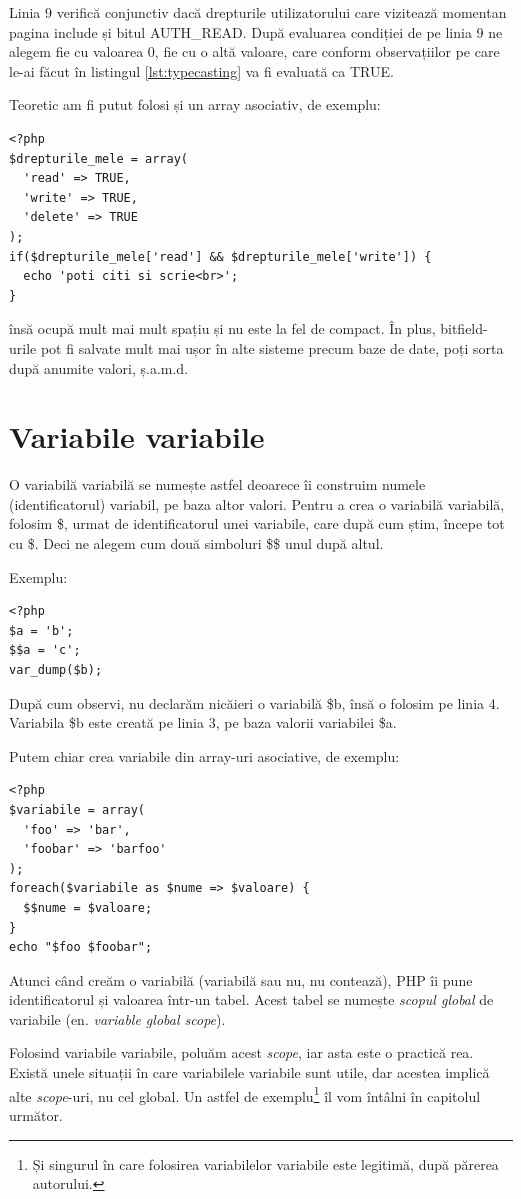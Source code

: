 Linia 9 verifică conjunctiv dacă drepturile utilizatorului care vizitează
momentan pagina include și bitul AUTH\_READ. După evaluarea condiției
de pe linia 9 ne alegem fie cu valoarea 0, fie cu o altă valoare,
care conform observațiilor pe care le-ai făcut în listingul \ref{lst:typecasting}
va fi evaluată ca TRUE.

Teoretic am fi putut folosi și un array asociativ, de exemplu:
\begin{lstlisting}
<?php
$drepturile_mele = array(
  'read' => TRUE,
  'write' => TRUE,
  'delete' => TRUE
);
if($drepturile_mele['read'] && $drepturile_mele['write']) {
  echo 'poti citi si scrie<br>';
}
\end{lstlisting}
însă ocupă mult mai mult spațiu și nu este la fel de compact.
În plus, bitfield-urile pot fi salvate mult mai ușor în alte
sisteme precum baze de date, poți sorta după anumite valori, ș.a.m.d.

\section{Variabile variabile}
O variabilă variabilă se numește astfel deoarece îi construim numele (identificatorul) variabil,
pe baza altor valori. Pentru a crea o variabilă variabilă, folosim \$, urmat de identificatorul unei variabile,
care după cum știm, începe tot cu \$. Deci ne alegem cum două simboluri \$\$ unul după altul.

Exemplu:
\begin{lstlisting}
<?php
$a = 'b';
$$a = 'c';
var_dump($b);
\end{lstlisting}
După cum observi, nu declarăm nicăieri o variabilă \$b, însă o folosim pe linia 4.
Variabila \$b este creată pe linia 3, pe baza valorii variabilei \$a.

Putem chiar crea variabile din array-uri asociative, de exemplu:
\begin{lstlisting}[label=lst:varvarfromassoc,caption=Variabile variabile din array asociativ]
<?php
$variabile = array(
  'foo' => 'bar',
  'foobar' => 'barfoo'
);
foreach($variabile as $nume => $valoare) {
  $$nume = $valoare;
}
echo "$foo $foobar";
\end{lstlisting}

Atunci când creăm o variabilă (variabilă sau nu, nu contează), PHP îi pune identificatorul și valoarea
într-un tabel. Acest tabel se numește \textsl{scopul global} de variabile (en. \textsl{variable global scope}).

Folosind variabile variabile, poluăm acest \textit{scope}, iar asta este o practică rea.
Există unele situații în care variabilele variabile sunt utile, dar acestea implică
alte \textit{scope}-uri, nu cel global. Un astfel de exemplu\footnote{Și singurul în care
folosirea variabilelor variabile este legitimă, după părerea autorului.} îl vom întâlni
în capitolul următor.

